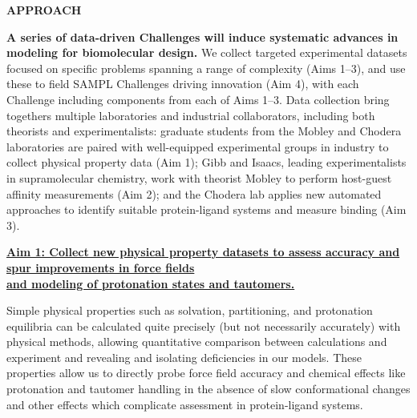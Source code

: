 \documentclass[11pt]{article}
\begin{document}
{\Large\textbf{APPROACH}}



\textbf{A series of data-driven Challenges will induce systematic advances in modeling for biomolecular design.}
We collect targeted experimental datasets focused on specific problems spanning a range of complexity (Aims 1--3), and use these to field SAMPL Challenges driving innovation (Aim 4), with each Challenge including components from each of Aims 1--3.
Data collection bring togethers multiple laboratories and industrial collaborators, including both theorists and experimentalists: graduate students from the Mobley and Chodera laboratories are paired with well-equipped experimental groups in industry to collect physical property data (Aim 1); Gibb and Isaacs, leading experimentalists in supramolecular chemistry, work with theorist Mobley to perform host-guest affinity measurements (Aim 2); and the Chodera lab applies new automated approaches to identify suitable protein-ligand systems and measure binding (Aim 3).


\textbf{\underline{Aim 1: Collect new physical property datasets to assess accuracy and spur improvements in force fields}}\\
\textbf{\underline{and modeling of protonation states and tautomers.}} 


Simple physical properties such as solvation, partitioning, and protonation equilibria can be calculated quite precisely (but not necessarily accurately) with physical methods, allowing quantitative comparison between calculations and experiment and revealing and isolating deficiencies in our models. 
These properties allow us to directly probe force field accuracy and chemical effects like protonation and tautomer handling in the absence of slow conformational changes and other effects which complicate assessment in protein-ligand systems. 
\end{document}
